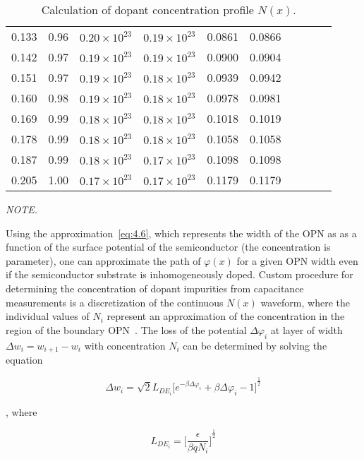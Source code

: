 \begin{table}[h!]
\begin{tabular}{c c c c c c c c c c}
    0.133 & 0.96 & $0.20\times10^{23}$ & $0.19\times10^{23}$ & 0.0861 & 0.0866 \\
    0.142 & 0.97 & $0.19\times10^{23}$ & $0.19\times10^{23}$ & 0.0900 & 0.0904 \\
    0.151 & 0.97 & $0.19\times10^{23}$ & $0.18\times10^{23}$ & 0.0939 & 0.0942 \\
    0.160 & 0.98 & $0.19\times10^{23}$ & $0.18\times10^{23}$ & 0.0978 & 0.0981 \\
    0.169 & 0.99 & $0.18\times10^{23}$ & $0.18\times10^{23}$ & 0.1018 & 0.1019 \\
    0.178 & 0.99 & $0.18\times10^{23}$ & $0.18\times10^{23}$ & 0.1058 & 0.1058 \\
    0.187 & 0.99 & $0.18\times10^{23}$ & $0.17\times10^{23}$ & 0.1098 & 0.1098 \\
    0.205 & 1.00 & $0.17\times10^{23}$ & $0.17\times10^{23}$ & 0.1179 & 0.1179 \\
  \end{tabular}
  \caption[Calculation of dopant concentration profile
    $N(x)$]{Calculation of dopant concentration profile
    $N(x)$.}\label{tab:4.1}
\end{table}


\emph{NOTE.}

Using the approximation~\ref{eq:4.6}, which represents the width of
the OPN as as a function of the surface potential of the semiconductor
(the concentration is parameter), one can approximate the path of
$\varphi(x)$ for a given OPN width even if the semiconductor substrate
is inhomogeneously doped.  Custom procedure for determining the
concentration of dopant impurities from capacitance measurements is a
discretization of the continuous $N(x)$ waveform, where the individual
values of $N_i$ represent an approximation of the concentration in the
region of the boundary OPN~\cite{4.1, 4.2, 4.3}.  The loss of the
potential $\Delta\varphi_i$ at layer of width $\Delta
w_{i}=w_{i+1}-w_{i}$ with concentration $N_i$ can be determined by
solving the equation

\begin{equation}\label{eq:4.8}
  \Delta w_{i} = \sqrt{2}L_{DE_{i}}{\Big[e^{-\beta\Delta\varphi_{i}} + \beta\Delta\varphi_{i} - 1\Big]}^{\frac{1}{2}}
\end{equation}

, where

\begin{equation}\label{eq:4.9}
  L_{DE_{i}} = {\bigg[\frac{\epsilon}{\beta qN_{i}}\bigg]}^{\frac{1}{2}}
\end{equation}

